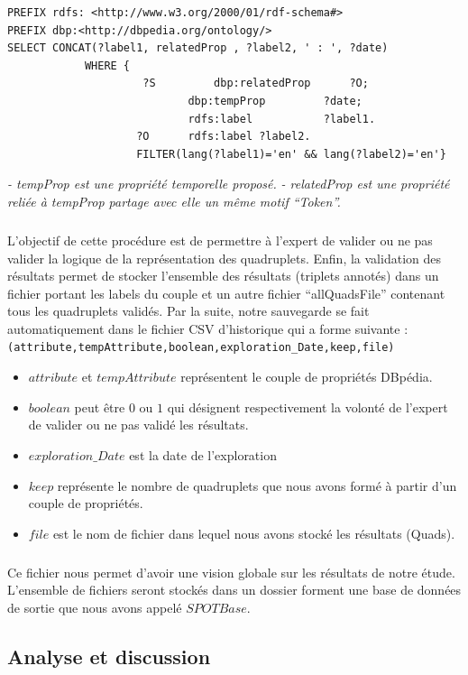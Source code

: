 \begin{verbatim}
PREFIX rdfs: <http://www.w3.org/2000/01/rdf-schema#> 
PREFIX dbp:<http://dbpedia.org/ontology/> 
SELECT CONCAT(?label1, relatedProp , ?label2, ' : ', ?date) 
			WHERE {  
					 ?S   		dbp:relatedProp 	 ?O;
							dbp:tempProp		 ?date;
							rdfs:label 			 ?label1.
					?O 		rdfs:label ?label2.
					FILTER(lang(?label1)='en' && lang(?label2)='en'}
\end{verbatim}
{\it - tempProp est une propriété temporelle proposé.}
\newline
{\it - relatedProp est une propriété reliée à tempProp partage avec elle un même motif ``Token''.}
\subparagraph{}
L'objectif de cette procédure est de permettre à l'expert de valider ou ne pas valider la logique de la représentation des quadruplets. Enfin, la validation des résultats permet de stocker l'ensemble des résultats (triplets annotés) dans un fichier portant les labels du couple et un autre fichier ``allQuadsFile'' contenant tous les quadruplets validés. Par la suite, notre sauvegarde se fait automatiquement dans le fichier CSV d'historique qui a forme suivante :
\newline
{\tt (attribute,tempAttribute,boolean,exploration\_Date,keep,file)} 
\begin{itemize}
\item $attribute$ et $tempAttribute$ représentent le couple de propriétés DBpédia.
\item $boolean$ peut être $0$ ou $1$ qui désignent respectivement la volonté de l'expert de valider ou ne pas validé les résultats.
\item $exploration\_Date$ est la date de l'exploration
\item $keep$ représente le nombre de quadruplets que nous avons formé à partir d'un couple de propriétés.
\item $file$ est le nom de fichier dans lequel nous avons stocké les résultats (Quads).
\end{itemize}
\subparagraph{}
Ce fichier nous permet d'avoir une vision globale sur les résultats de notre étude.
L'ensemble de fichiers seront stockés dans un dossier forment une base de données de sortie que nous avons appelé $SPOTBase$.
\subsection{Analyse et discussion}
